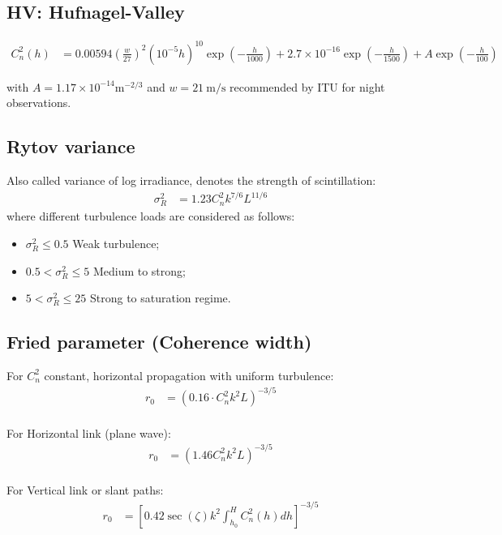 \documentclass[a4paper]{article}
\begin{document}
\subsection{HV: Hufnagel-Valley}
%

\begin{align*}
C_n^2(h) &= 0.00594\left(\frac{w}{27}\right)^2(10^{-5}h)^{10}\exp\left(-\frac{h}{1000}\right) 
+ 2.7\times 10^{-16}\exp\left(-\frac{h}{1500}\right)
+ A\exp\left(-\frac{h}{100}\right)
\end{align*}

with $A=1.17\times 10^{-14}\textrm{m}^{-2/3}$ and $w=21\ \textrm{m/s}$ recommended by ITU for night observations.

\subsection{Rytov variance}
Also called variance of log irradiance, denotes the strength of scintillation:
\begin{align*}
\sigma_R^2 &= 1.23C_n^2 k^{7/6}L^{11/6}
\end{align*}
where different turbulence loads are considered as follows:
\begin{itemize}
\item $\sigma^2_R \leq 0.5$ Weak turbulence;
\item $0.5 < \sigma^2_R \leq 5$ Medium to strong;
\item $5 < \sigma^2_R \leq 25$ Strong to saturation regime.
\end{itemize}
\subsection{Fried parameter (Coherence width)}
For $C_n^2$ constant, horizontal propagation with uniform turbulence:
\begin{align*}
r_0 &= (0.16\cdot C_n^2 k^2 L)^{-3/5}
\end{align*}
\\
For Horizontal link (plane wave):
\begin{align*}
r_0 &= \left(1.46C_n^2k^2L\right)^{-3/5}
\end{align*}
\\
For Vertical link or slant paths:\\
\begin{align*}
r_0 &= \left[0.42\sec(\zeta)k^2\int_{h_0}^H C_n^2(h)dh\right]^{-3/5}
\end{align*}
\end{document}
